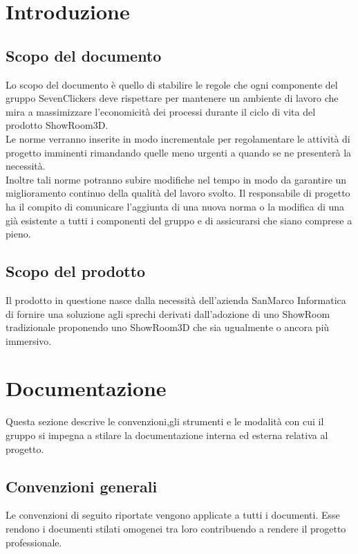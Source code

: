 \newcommand\myfontsize{\fontsize{13pt}{18pt}\selectfont}
\section{Introduzione}
\subsection{Scopo del documento}
Lo scopo del documento è quello di stabilire le regole che ogni componente del gruppo SevenClickers
deve rispettare per mantenere un ambiente di lavoro che mira a massimizzare
l'economicità dei processi durante il ciclo di vita del prodotto ShowRoom3D.\\
Le norme verranno inserite in modo incrementale per regolamentare le attività di progetto imminenti rimandando quelle meno urgenti a quando 
se ne presenterà la necessità.\\
Inoltre tali norme potranno subire modifiche nel tempo in modo da garantire un miglioramento continuo della qualità del lavoro svolto.
Il responsabile di progetto ha il compito di comunicare l'aggiunta di una nuova norma o la modifica di una già esistente a tutti i componenti
del gruppo e di assicurarsi che siano comprese a pieno.
\subsection{Scopo del prodotto}
Il prodotto in questione nasce dalla necessità dell'azienda SanMarco Informatica di fornire una soluzione agli sprechi
derivati dall'adozione di uno ShowRoom tradizionale proponendo uno ShowRoom3D che sia 
ugualmente o ancora più immersivo.


\section{Documentazione}
Questa sezione descrive le convenzioni,gli strumenti e le modalità con cui il gruppo si impegna a stilare la documentazione interna ed esterna relativa al progetto.
\subsection{Convenzioni generali}
Le convenzioni di seguito riportate vengono applicate a tutti i documenti.
Esse rendono i documenti stilati omogenei tra loro contribuendo a rendere il progetto professionale.

